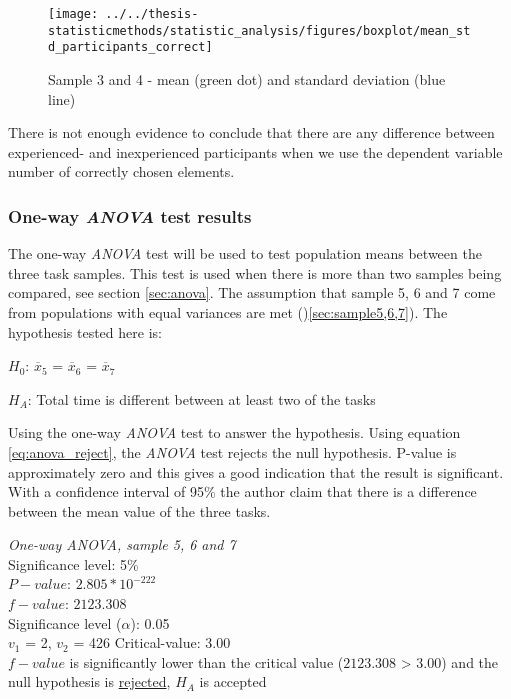 \begin{figure}[H]
	\centering
	\texttt{[image: ../../thesis-statisticmethods/statistic\_analysis/figures/boxplot/mean\_std\_participants\_correct]}
	\caption{Sample 3 and 4 - mean (green dot) and standard deviation (blue line)}
	\label{fig:meanstdparticipantscorrect}
\end{figure}

There is not enough evidence to conclude that there are any difference between experienced- and inexperienced participants when we use the dependent variable number of correctly chosen elements. 

\subsubsection{One-way \textit{ANOVA} test results}\label{sec:anova_result}

The one-way \textit{ANOVA} test will be used to test population means between the three task samples. This test is used when there is more than two samples being compared, see section \ref{sec:anova}. The assumption that sample 5, 6 and 7 come from populations with equal variances are met ()\ref{sec:sample5,6,7}). The hypothesis tested here is: \\

\centerline{$H_{0}$: $\overline{x}_5$ = $\overline{x}_6$ = $\overline{x}_7$}
\centerline{$H_{A}$: Total time is different between at least two of the tasks}

Using the one-way \textit{ANOVA} test to answer the hypothesis. Using equation \ref{eq:anova_reject}, the \textit{ANOVA} test rejects the null hypothesis. P-value is approximately zero and this gives a good indication that the result is significant. With a confidence interval of 95\% the author claim that there is a difference between the mean value of the three tasks.

 \begin{center}
	\begin{tcolorbox}[box align=center,width=\textwidth-5cm]
		\centering
		\textit{One-way \textit{ANOVA}, sample 5, 6 and 7}\\
		Significance level: 5\%  \\[0.5cm]
		
		$P-value$: $2.805 * 10^{-222}$ \\
		$f-value$: $2123.308$ \\
		Significance level ($\alpha$): 0.05 \\
		$v_1$ = 2, $v_2$ = 426
		Critical-value: 3.00 \\[0.2cm] %
		
		$f-value$ is significantly lower than the critical value ($2123.308$ > $3.00$) and the null hypothesis is \underline{rejected}, $H_A$ is accepted\\[0.5cm]
	\end{tcolorbox} 
\end{center}

